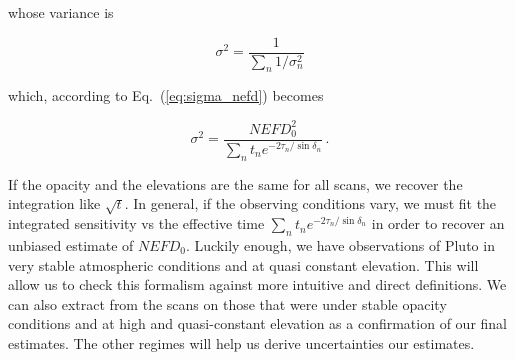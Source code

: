 whose variance is

\begin{equation}
\sigma^2 = \frac{1}{\sum_n 1/\sigma_n^2}
\end{equation}

which, according to Eq.~(\ref{eq:sigma_nefd}) becomes

\begin{equation}
\sigma^2 = \frac{NEFD_0^2}{\sum_{n}t_n e^{-2\tau_n/\sin\delta_n}}\,.
\label{eq:sigma_tau_w8}
\end{equation}

If the opacity and the elevations are the same for all scans, we recover the
integration like $\sqrt{t}$. In general, if the observing conditions vary, we
must fit the integrated sensitivity vs the effective time $\sum_{n}t_n
e^{-2\tau_n/\sin\delta_n}$ in order to recover an unbiased estimate of
$NEFD_0$. Luckily enough, we have observations of Pluto in very stable
atmospheric conditions and at quasi constant elevation. This will allow us to
check this formalism against more intuitive and direct definitions. We can also
extract from the scans on \hls those that were under stable opacity conditions
and at high and quasi-constant elevation as a confirmation of our final
estimates. The other regimes will help us derive uncertainties our estimates.\\

